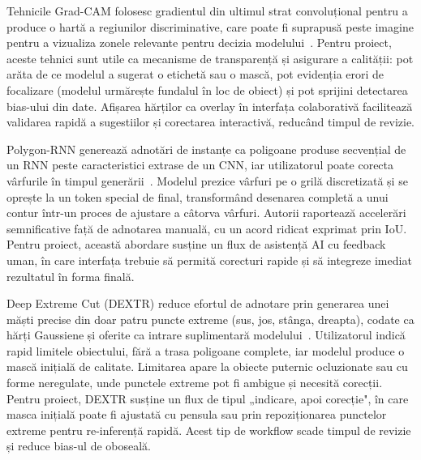 Tehnicile Grad-CAM folosesc gradientul din ultimul strat convoluțional pentru a produce o hartă a regiunilor discriminative, care poate fi suprapusă peste imagine pentru a vizualiza zonele relevante pentru decizia modelului~\cite{Selvaraju_2019}. Pentru proiect, aceste tehnici sunt utile ca mecanisme de transparență și asigurare a calității: pot arăta de ce modelul a sugerat o etichetă sau o mască, pot evidenția erori de focalizare (modelul urmărește fundalul în loc de obiect) și pot sprijini detectarea bias-ului din date. Afișarea hărților ca overlay în interfața colaborativă facilitează validarea rapidă a sugestiilor și corectarea interactivă, reducând timpul de revizie.

Polygon-RNN generează adnotări de instanțe ca poligoane produse secvențial de un RNN peste caracteristici extrase de un CNN, iar utilizatorul poate corecta vârfurile în timpul generării~\cite{castrejon2017annotatingobjectinstancespolygonrnn}. Modelul prezice vârfuri pe o grilă discretizată și se oprește la un token special de final, transformând desenarea completă a unui contur într-un proces de ajustare a câtorva vârfuri. Autorii raportează accelerări semnificative față de adnotarea manuală, cu un acord ridicat exprimat prin IoU. Pentru proiect, această abordare susține un flux de asistență AI cu feedback uman, în care interfața trebuie să permită corecturi rapide și să integreze imediat rezultatul în forma finală.

Deep Extreme Cut (DEXTR) reduce efortul de adnotare prin generarea unei măști precise din doar patru puncte extreme (sus, jos, stânga, dreapta), codate ca hărți Gaussiene și oferite ca intrare suplimentară modelului~\cite{maninis2018deepextremecutextreme}. Utilizatorul indică rapid limitele obiectului, fără a trasa poligoane complete, iar modelul produce o mască inițială de calitate. Limitarea apare la obiecte puternic ocluzionate sau cu forme neregulate, unde punctele extreme pot fi ambigue și necesită corecții. Pentru proiect, DEXTR susține un flux de tipul „indicare, apoi corecție", în care masca inițială poate fi ajustată cu pensula sau prin repoziționarea punctelor extreme pentru re-inferență rapidă. Acest tip de workflow scade timpul de revizie și reduce bias-ul de oboseală.

